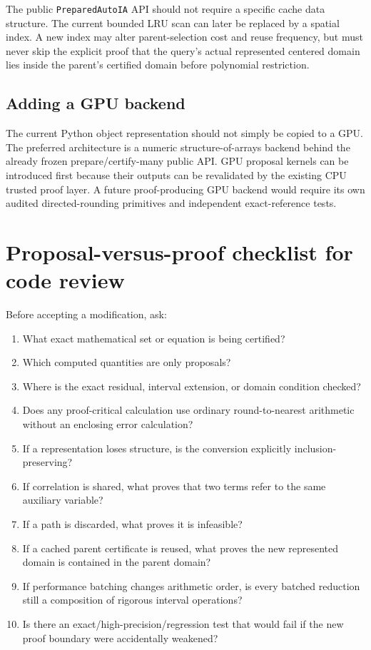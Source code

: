 \documentclass[11pt]{article}
\begin{document}
The public \texttt{PreparedAutoIA} API should not require a specific cache data
structure.  The current bounded LRU scan can later be replaced by a spatial index.
A new index may alter parent-selection cost and reuse frequency, but must never
skip the explicit proof that the query's actual represented centered domain lies
inside the parent's certified domain before polynomial restriction.

\subsection{Adding a GPU backend}

The current Python object representation should not simply be copied to a GPU.
The preferred architecture is a numeric structure-of-arrays backend behind the
already frozen prepare/certify-many public API.  GPU proposal kernels can be
introduced first because their outputs can be revalidated by the existing CPU
trusted proof layer.  A future proof-producing GPU backend would require its own
audited directed-rounding primitives and independent exact-reference tests.

\section{Proposal-versus-proof checklist for code review}

Before accepting a modification, ask:
\begin{enumerate}[leftmargin=*]
\item What exact mathematical set or equation is being certified?
\item Which computed quantities are only proposals?
\item Where is the exact residual, interval extension, or domain condition checked?
\item Does any proof-critical calculation use ordinary round-to-nearest arithmetic
without an enclosing error calculation?
\item If a representation loses structure, is the conversion explicitly
inclusion-preserving?
\item If correlation is shared, what proves that two terms refer to the same
auxiliary variable?
\item If a path is discarded, what proves it is infeasible?
\item If a cached parent certificate is reused, what proves the new represented
domain is contained in the parent domain?
\item If performance batching changes arithmetic order, is every batched reduction
still a composition of rigorous interval operations?
\item Is there an exact/high-precision/regression test that would fail if the new
proof boundary were accidentally weakened?
\end{enumerate}
\end{document}
